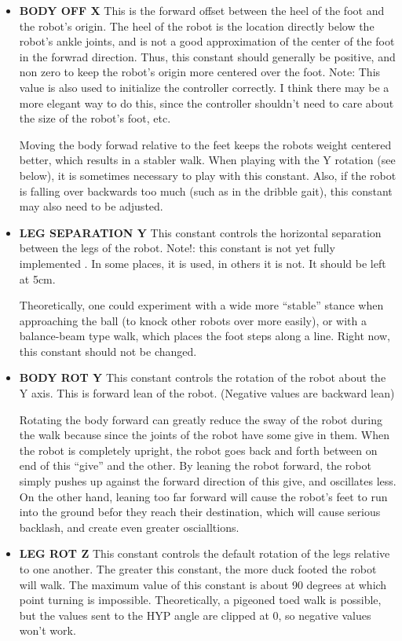 \documentclass[11pt]{article}
\begin{document}
\begin{itemize}
\item {\bf BODY OFF X} This is the forward offset between the heel of the foot
and the robot's origin. The heel of the robot is the location directly below
the robot's ankle joints, and is not a good approximation of the center of
the foot in the forwrad direction. Thus, this constant should generally be
positive, and non zero to keep the robot's origin more centered over the
foot.  Note: This value is also used to initialize the controller correctly.
I think there may be a more elegant way to do this, since the controller
shouldn't need to care about the size of the robot's foot, etc.

Moving the body forwad relative to the feet keeps the robots weight centered
better, which results in a stabler walk.  When playing with the Y rotation
(see below), it is sometimes necessary to play with this constant.  Also,
if the robot is falling over backwards too much (such as in the dribble gait),
this constant may also need to be adjusted.


\item {\bf LEG SEPARATION Y}  This constant controls the horizontal separation
between the legs of the robot. Note!: this constant is not yet fully implemented
. In some places, it is used, in others it is not. It should be left at 5cm.

Theoretically, one could experiment with a wide more ``stable'' stance when
approaching the ball (to knock other robots over more easily), or with a
balance-beam type walk, which places the foot steps along a line. Right now,
this constant should not be changed.

\item {\bf BODY ROT Y} This constant controls the rotation of the robot about
the Y axis. This is forward lean of the robot. (Negative values are backward
 lean)

Rotating the body forward can greatly reduce the sway of the robot during
the walk because since the joints of the robot have some give in them. When the
robot is completely upright, the robot goes back and forth between on end of
this ``give'' and the other. By leaning the robot forward, the robot simply
pushes up against the forward direction of this give, and oscillates less.
On the other hand, leaning too far forward will cause the robot's feet to run
into the ground befor they reach their destination, which will cause serious
backlash, and create even greater oscialltions.

\item {\bf LEG ROT Z}  This constant controls the default rotation of the legs
relative to one another. The greater this constant, the more duck footed
the robot will walk.  The maximum value of this constant is about 90 degrees
at which point turning is impossible.  Theoretically, a pigeoned toed walk
is possible, but the values sent to the HYP angle are clipped at 0, so negative
values won't work.


\end{itemize}
\end{document}
